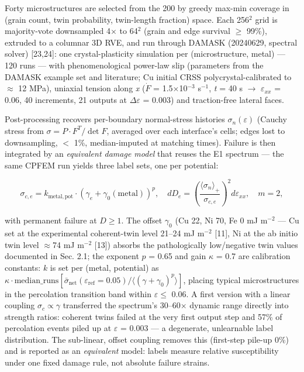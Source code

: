 \documentclass[12pt]{article}
\begin{document}
Forty microstructures are selected from the 200 by greedy max-min coverage in (grain count, twin probability, twin-length fraction) space. Each 256$^{2}$ grid is majority-vote downsampled 4$\times$ to 64$^{2}$ (grain and edge survival $\ge$ 99\%), extruded to a columnar 3D RVE, and run through DAMASK (20240629, spectral solver) [23,24]: one crystal-plasticity simulation per (microstructure, metal) --- 120 runs --- with phenomenological power-law slip (parameters from the DAMASK example set and literature; Cu initial CRSS polycrystal-calibrated to $\approx$ 12 MPa), uniaxial tension along \textit{x} ($\dot F$ = 1.5$\times$10$^{-3}$ s$^{-1}$, \textit{t} = 40 s $\rightarrow$ $\varepsilon_{xx}$ = 0.06, 40 increments, 21 outputs at $\Delta\varepsilon$ = 0.003) and traction-free lateral faces.

Post-processing recovers per-boundary normal-stress histories $\sigma_n(\varepsilon)$ (Cauchy stress from $\sigma = P\cdot F^{T}/\det F$, averaged over each interface's cells; edges lost to downsampling, $<$ 1\%, median-imputed at matching times). Failure is then integrated by an \textit{equivalent damage model} that reuses the E1 spectrum --- the same CPFEM run yields three label sets, one per potential:

\[
\sigma_{c,e} = k_{\mathrm{metal,pot}} \cdot \left(\gamma_e + \gamma_0(\mathrm{metal})\right)^{p}, \quad
dD_e = \left(\frac{\langle\sigma_n\rangle_{+}}{\sigma_{c,e}}\right)^{2} d\varepsilon_{xx}, \quad m = 2,
\]

with permanent failure at $D \ge 1$. The offset $\gamma_0$ (Cu 22, Ni 70, Fe 0 mJ m$^{-2}$ --- Cu set at the experimental coherent-twin level 21--24 mJ m$^{-2}$ [11], Ni at the ab initio twin level $\approx$74 mJ m$^{-2}$ [13]) absorbs the pathologically low/negative twin values documented in Sec. 2.1; the exponent $p$ = 0.65 and gain $\kappa$ = 0.7 are calibration constants: $k$ is set per (metal, potential) as $\kappa \cdot \mathrm{median\_runs}[\bar{\sigma}_{\mathrm{net}}(\varepsilon_{\mathrm{ref}} = 0.05) / \langle(\gamma+\gamma_0)^{p}\rangle]$, placing typical microstructures in the percolation transition band within $\varepsilon \le$ 0.06. A first version with a linear coupling $\sigma_{c} \propto \gamma$ transferred the spectrum's 30--60$\times$ dynamic range directly into strength ratios: coherent twins failed at the very first output step and 57\% of percolation events piled up at $\varepsilon$ = 0.003 --- a degenerate, unlearnable label distribution. The sub-linear, offset coupling removes this (first-step pile-up 0\%) and is reported as an \textit{equivalent} model: labels measure relative susceptibility under one fixed damage rule, not absolute failure strains.
\end{document}
